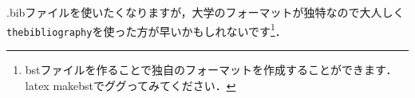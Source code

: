 
.bibファイルを使いたくなりますが，大学のフォーマットが独特なので大人しく\verb|thebibliography|を使った方が早いかもしれないです\footnote{bstファイルを作ることで独自のフォーマットを作成することができます．latex makebstでググってみてください．}．
